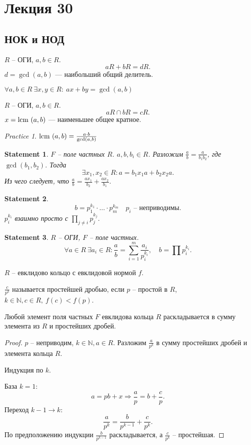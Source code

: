 \documentclass[11pt]{book}
\newcommand{\N}{\mathbb{N}}
\newcommand{\lcm}{{\mathop{\text{\rm lcm}}}~}
\theoremstyle{definition}
\theoremstyle{plain}
\theoremstyle{plain}
\newtheorem*{st}{Statement}
\theoremstyle{definition}
\theoremstyle{remark}
\newtheorem*{prac}{Practice}
\begin{document}
 \section{Лекция 30}
 \subsection{НОК и НОД}
 \begin{defn}
     $ R$ -- ОГИ, $ a, b \in  R$.\[
     aR + bR = dR
     .\] 
     $ d = \gcd (a, b)$ --- наибольший общий делитель.
 \end{defn}
 \begin{thm}
     $ \forall a, b \in  R ~\exists  x, y \in  R: ~ ax + by = \gcd(a, b)$
 \end{thm}
 \begin{defn}
     $ R$ -- ОГИ, $ a, b \in  R$.
 $$ aR \cap  bR = cR.$$
 $ x = \lcm (a, b)$ --- наименьшее общее кратное.
 \end{defn}
 \begin{prac}
     $ \lcm(a, b) = \frac{a \cdot b}{\gcd(a, b)}$
 \end{prac}
 \begin{st}
     $ F$ -- поле частных $ R$. $ a, b, b_i \in  R$.
     Разложим $ \frac{a}{b} = \frac{a}{b_1 b_2}$, где $ \gcd(b_1, b_2)$.
     Тогда \[
     \exists  x_1, x_2 \in  R: a = b_1x_1 a + b_2x_2a
     .\] 
     Из чего следует, что $ \frac{a}{b} = \frac{ax_1}{b_2} + \frac{ax_2}{b_1}$. 
 \end{st}
 \begin{st}
     \[
     b = p_1^{k_1} \cdot  \ldots  \cdot  p_m ^{k_m} \quad  p_i \text{ -- неприводимы}
     .\] 
     $ p_i^{k_i} $ взаимно просто с $ \prod_{j \ne i} p_j ^{k_j}$.
 \end{st}
 \begin{st}
     $ R$ -- ОГИ, $ F$ -- поле частных.
     \[
	 \forall a \in  R ~ \exists  a_i \in  R: \frac{a}{b} = \sum_{i=1}^{m} \frac{a_i}{p_i^{k_i}}, \quad b = \prod p_i^{k_i}
     .\] 
 \end{st}
 \begin{defn}
     $ R$ -- евклидово кольцо с евклидовой нормой $ f$.

     $ \frac{c}{p^{k}}$  называется простейшей дробью, если $ p$ -- простой в $ R$, $ k \in \N, c \in  R, ~ f(c) < f(p)$.
 \end{defn}
 \begin{thm}
     Любой элемент поля частных $ F$ евклидова кольца $ R$ раскладывается в сумму элемента из $ R$ и простейших дробей. 
 \end{thm}
 \begin{proof}
     $ p $ -- неприводим, $ k \in  \N, a \in  R $. Разложим $ \frac{a}{p^{k}}$ в сумму простейших дробей и элемента кольца $ R$.
      
     Индукция по $ k$.

     База $ k = 1$:
      \[
     a = pb + x \Longrightarrow \frac{a}{p } = b + \frac{c}{p}
     .\] 
     Переход $ k -1 \to  k$:
     \[
     \frac{a}{p^{k}} = \frac{b}{p^{k-1}} + \frac{c}{p^{k}}
     .\] 
     По предположению индукции $ \frac{b}{p^{k-1}}$ раскладывается, а $ \frac{c}{p^{k}}$ -- простейшая.
 \end{proof}
\end{document}
